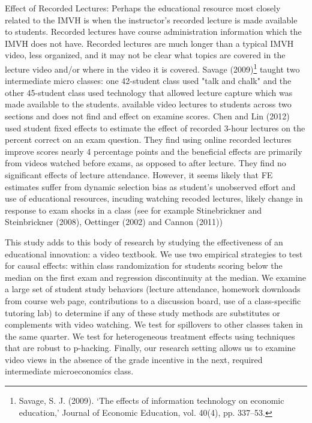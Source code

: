 \documentclass[12pt]{article}
\begin{document}
Effect of Recorded Lectures:  Perhaps the educational resource most closely related to the IMVH is when the instructor's recorded lecture is made available to students.  Recorded lectures have course administration information which the IMVH does not have. Recorded lectures are much longer than a typical IMVH video, less organized, and it may not be clear what topics are covered in the lecture video and/or where in the video it is covered.  Savage (2009)\footnote{Savage, S. J. (2009). ‘The effects of information technology on economic education,’ Journal of Economic Education, vol. 40(4), pp. 337–53.} taught two intermediate micro classes:  one 42-student class used "talk and chalk" and the other 45-student class used technology that allowed lecture capture which was made available to the students.  available video lectures to students across two sections and does not find and effect on examine scores.  Chen and Lin (2012) used student fixed effects to estimate the effect of recorded 3-hour lectures on the percent correct on an exam question.  They find using online recorded lectures improve scores nearly 4 percentage points and the beneficial effects are primarily from videos watched before exams, as opposed to after lecture.  They find no significant effects of lecture attendance.  However, it seems likely that FE estimates suffer from dynamic selection bias as student's unobserved effort and use of educational resources, incuding watching recoded lectures, likely change in response to exam shocks in a class (see for example Stinebrickner and Steinbrickner (2008), Oettinger (2002) and Cannon (2011))



This study adds to this body of research by studying the effectiveness of an educational innovation:  a video textbook.  We use two empirical strategies to test for causal effects:  within class randomization for students scoring below the median on the first exam and regression discontinuity at the median.  We examine a large set of student study behaviors (lecture attendance, homework downloads from course web page, contributions to a discussion board, use of a class-specific tutoring lab) to determine if any of these study methods are substitutes or complements with video watching.  We test for spillovers to other classes taken in the same quarter.  We test for heterogeneous treatment effects using techniques that are robust to p-hacking.  Finally, our research setting allows us to examine video views in the absence of the grade incentive in the next, required intermediate microeconomics class.  
\end{document}
